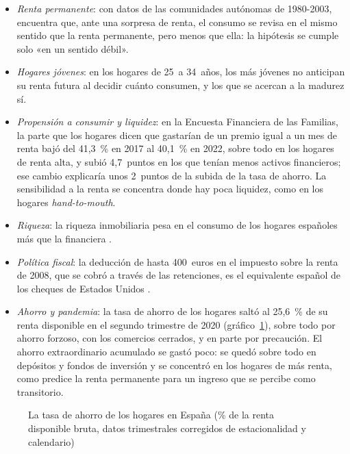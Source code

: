 \documentclass[11pt]{article}
\begin{document}
\begin{itemize}
\item \emph{Renta permanente}: con datos de las comunidades autónomas de 1980-2003, \textcite{NunezCarrasco2010Contraste} encuentra que, ante una sorpresa de renta, el consumo se revisa en el mismo sentido que la renta permanente, pero menos que ella: la hipótesis se cumple solo «en un sentido débil».
\item \emph{Hogares jóvenes}: en los hogares de 25~a 34~años, los más jóvenes no anticipan su renta futura al decidir cuánto consumen, y los que se acercan a la madurez sí\nocite{NunezCarrasco2006Consumo,NunezCarrasco2008Consumo}.
\item \emph{Propensión a consumir y liquidez}: en la Encuesta Financiera de las Familias, la parte que los hogares dicen que gastarían de un premio igual a un mes de renta bajó del 41,3~\% en 2017 al 40,1~\% en 2022, sobre todo en los hogares de renta alta, y subió 4,7~puntos en los que tenían menos activos financieros; ese cambio explicaría unos 2~puntos de la subida de la tasa de ahorro\nocite{BassoGomezGarcia2025Propension}. La sensibilidad a la renta se concentra donde hay poca liquidez, como en los hogares \emph{hand-to-mouth}.
\item \emph{Riqueza}: la riqueza inmobiliaria pesa en el consumo de los hogares españoles más que la financiera\nocite{Bover2005Wealth} .
\item \emph{Política fiscal}: la deducción de hasta 400~euros en el impuesto sobre la renta de 2008, que se cobró a través de las retenciones\nocite{BOE2008RDL2}, es el equivalente español de los cheques de Estados Unidos .
\item \emph{Ahorro y pandemia}: la tasa de ahorro de los hogares saltó al 25,6~\% de su renta disponible en el segundo trimestre de 2020\nocite{INE2026CTNFSI} (gráfico~\ref{fig:tasa-ahorro-hogares}), sobre todo por ahorro forzoso, con los comercios cerrados, y en parte por precaución. El ahorro extraordinario acumulado se gastó poco: se quedó sobre todo en depósitos y fondos de inversión y se concentró en los hogares de más renta\nocite{AlvesMartinezCarrascal2023}, como predice la renta permanente para un ingreso que se percibe como transitorio.
\end{itemize}

\begin{figure}[H]
\centering
\caption{La tasa de ahorro de los hogares en España (\% de la renta disponible bruta, datos trimestrales corregidos de estacionalidad y calendario)}\label{fig:tasa-ahorro-hogares}
\end{figure}
\end{document}
